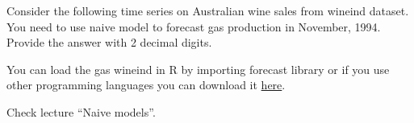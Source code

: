 
\begin{question}
Consider the following time series on Australian wine sales from wineind dataset. You need to use naive model to forecast gas production in November, 1994. Provide the answer with 2 decimal digits.

You can load the gas wineind in R by importing forecast library or if you use other programming languages you can download it \href{https://github.com/vincentarelbundock/Rdatasets/blob/master/csv/forecast/wineind.csv}{here}.
\end{question}

\begin{solution}
Check lecture ``Naive models''.
\end{solution}

